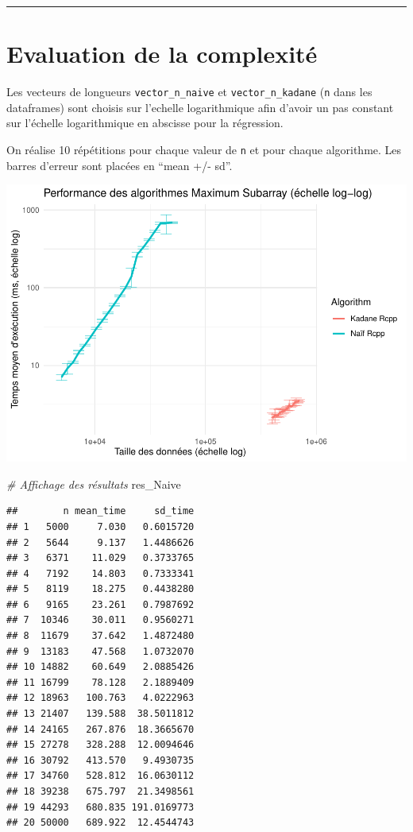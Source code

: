 \documentclass[
]{article}
\newenvironment{Shaded}{\begin{snugshade}}{\end{snugshade}}
\newcommand{\CommentTok}[1]{\textcolor[rgb]{0.56,0.35,0.01}{\textit{#1}}}
\newcommand{\NormalTok}[1]{#1}
\begin{document}
\begin{center}\rule{0.5\linewidth}{0.5pt}\end{center}

\section{Evaluation de la
complexité}\label{evaluation-de-la-complexituxe9}

Les vecteurs de longueurs \texttt{vector\_n\_naive} et
\texttt{vector\_n\_kadane} (\texttt{n} dans les dataframes) sont choisis
sur l'echelle logarithmique afin d'avoir un pas constant sur l'échelle
logarithmique en abscisse pour la régression.

On réalise 10 répétitions pour chaque valeur de \texttt{n} et pour
chaque algorithme. Les barres d'erreur sont placées en ``mean +/- sd''.

\includegraphics{MaxSubarray1D_files/figure-latex/simu complexite-1.pdf}

\begin{Shaded}
\begin{Highlighting}[]
\CommentTok{\# Affichage des résultats}
\NormalTok{res\_Naive}
\end{Highlighting}
\end{Shaded}

\begin{verbatim}
##        n mean_time     sd_time
## 1   5000     7.030   0.6015720
## 2   5644     9.137   1.4486626
## 3   6371    11.029   0.3733765
## 4   7192    14.803   0.7333341
## 5   8119    18.275   0.4438280
## 6   9165    23.261   0.7987692
## 7  10346    30.011   0.9560271
## 8  11679    37.642   1.4872480
## 9  13183    47.568   1.0732070
## 10 14882    60.649   2.0885426
## 11 16799    78.128   2.1889409
## 12 18963   100.763   4.0222963
## 13 21407   139.588  38.5011812
## 14 24165   267.876  18.3665670
## 15 27278   328.288  12.0094646
## 16 30792   413.570   9.4930735
## 17 34760   528.812  16.0630112
## 18 39238   675.797  21.3498561
## 19 44293   680.835 191.0169773
## 20 50000   689.922  12.4544743
\end{verbatim}
\end{document}
